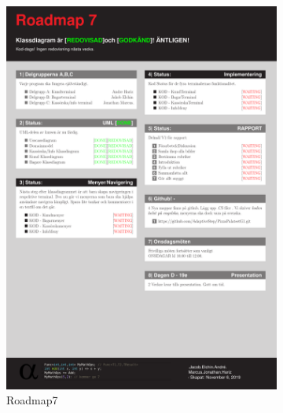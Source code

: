 \documentclass{article}
\theoremstyle{remark}                                         %
\begin{document}
\begin{figure}
\begin{subfigure}[b]{0.3\textwidth}
        \includegraphics[width=\textwidth]{img/Roadmap7.pdf}
        \caption{Roadmap7}
        \label{fig:road7}
    \end{subfigure}    
    \begin{subfigure}[b]{0.3\textwidth}

\end{subfigure}
\end{figure}
\end{document}

